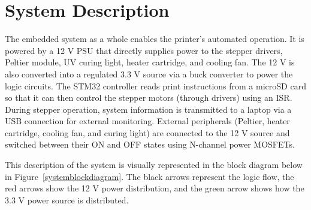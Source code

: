 \section{System Description}
The embedded system as a whole enables the printer's automated operation. It is powered by a 12 V PSU that directly supplies power to the stepper drivers, Peltier module, UV curing light, heater cartridge, and cooling fan. The 12 V is also converted into a regulated 3.3 V source via a buck converter to power the logic circuits. The STM32 controller reads print instructions from a microSD card so that it can then control the stepper motors (through drivers) using an ISR. During stepper operation, system information is transmitted to a laptop via a USB connection for external monitoring. External peripherals (Peltier, heater cartridge, cooling fan, and curing light) are connected to the 12 V source and switched between their ON and OFF states using N-channel power MOSFETs.

This description of the system is visually represented in the block diagram below in Figure~\ref{systemblockdiagram}. The black arrows represent the logic flow, the red arrows show the 12 V power distribution, and the green arrow shows how the 3.3 V power source is distributed.
    
